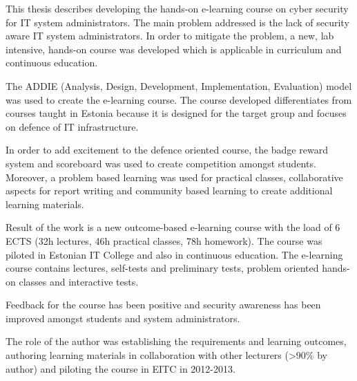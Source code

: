 This thesis describes developing the hands-on e-learning course on cyber security for IT system administrators. The main problem addressed is the lack of security aware IT system administrators. In order to mitigate the problem, a new, lab intensive, hands-on course was developed which is applicable in curriculum and continuous education.

The \gls{ADDIE} (Analysis, Design, Development, Implementation, Evaluation) model was used to create the e-learning course. The course developed differentiates from courses taught in Estonia because it is designed for the target group and focuses on defence of IT infrastructure.

In order to add excitement to the defence oriented course, the badge reward system and scoreboard was used to create competition amongst students. Moreover, a problem based learning was used for practical classes, collaborative aspects for report writing and community based learning to create additional learning materials.

Result of the work is a new outcome-based e-learning course with the load of 6 \gls{ECTS} (32h lectures, 46h practical classes, 78h homework). The course was piloted in Estonian IT College and also in continuous education. The e-learning course contains lectures, self-tests and preliminary tests, problem oriented hands-on classes and interactive tests. 

Feedback for the course has been positive and security awareness has been improved amongst students and system administrators. %

The role of the author was establishing the requirements and learning outcomes, authoring learning materials in collaboration with other lecturers (>90\% by author) and piloting the course in \gls{EITC} in 2012-2013.
